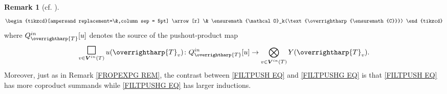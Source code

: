 \documentclass[a4paper,10pt
]{article}%
\numberwithin{equation}{section}
\numberwithin{figure}{section}
\theoremstyle{definition} %
\newtheorem{remark}[equation]{Remark}%
\newcommand{\vect}[1]{\text{\overrightharp{\ensuremath{#1}}}}
\renewcommand{\O}{\ensuremath{\mathcal O}}
\newcommand{\1}{\ensuremath{\mathbbm 1}}%
\begin{document}
\begin{remark}[{cf. \cite[Prop. 5.77]{BP21}}]
\begin{align}
\begin{tikzcd}[ampersand replacement=\&,column sep = 5pt]
	\arrow[r]
	\&
	\O_k(\vect{C})
	\end{tikzcd}
	\end{align}
	where $Q^{in}_{\vect{T}}[u]$ denotes the source of the pushout-product map
	\begin{equation}
	\mathop{\mathlarger{\mathlarger{\mathlarger{\square}}}}_{v \in \boldsymbol{V}^{in}(T)} u(\vect{T}_v) \colon Q^{in}_{\vect{T}}[u] \to \bigotimes_{v \in \boldsymbol{V}^{in}(T)} Y(\vect{T}_v).
	\end{equation}
%	
	Moreover, just as in Remark \ref{FROPEXPG REM},
	the contrast between
	\eqref{FILTPUSH EQ} and \eqref{FILTPUSHG EQ}
	is that \eqref{FILTPUSH EQ} has more coproduct summands while 
	\eqref{FILTPUSHG EQ}
	has larger inductions.
\end{remark}
\end{document}
